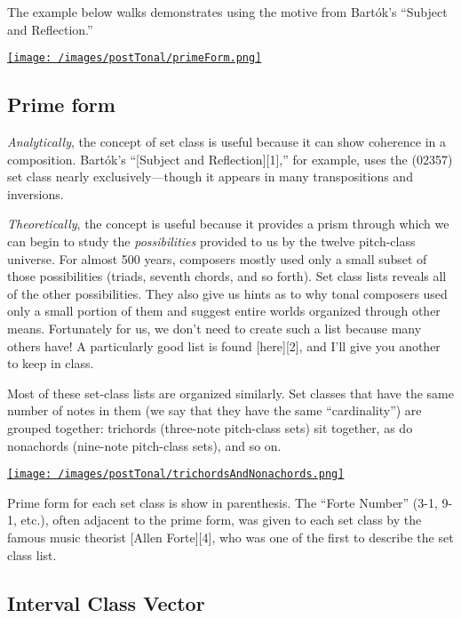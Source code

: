 \documentclass{book}
\begin{document}
The example below walks demonstrates using the motive from Bartók's ``Subject
and Reflection.''

\href{/images/postTonal/primeForm.png}{\texttt{[image: /images/postTonal/primeForm.png]}}

\hypertarget{prime-form-2}{%
\subsection{Prime form}\label{prime-form-2}}

\emph{Analytically}, the concept of set class is useful because it can show
coherence in a composition. Bartók's ``{[}Subject and Reflection{]}{[}1{]},''
for example, uses the (02357) set class nearly exclusively---though it appears
in many transpositions and inversions.

\emph{Theoretically}, the concept is useful because it provides a prism
through which we can begin to study the \emph{possibilities} provided to us by
the twelve pitch-class universe. For almost 500 years, composers mostly used
only a small subset of those possibilities (triads, seventh chords, and so
forth). Set class lists reveals all of the other possibilities. They also give
us hints as to why tonal composers used only a small portion of them and
suggest entire worlds organized through other means. Fortunately for us, we
don't need to create such a list because many others have! A particularly good
list is found {[}here{]}{[}2{]}, and I'll give you another to keep in class.

Most of these set-class lists are organized similarly. Set classes that have
the same number of notes in them (we say that they have the same
``cardinality'') are grouped together: trichords (three-note pitch-class sets)
sit together, as do nonachords (nine-note pitch-class sets), and so on.

\href{/images/postTonal/trichordsAndNonachords.png}{\texttt{[image: /images/postTonal/trichordsAndNonachords.png]}}

Prime form for each set class is show in parenthesis. The ``Forte Number''
(3-1, 9-1, etc.), often adjacent to the prime form, was given to each set
class by the famous music theorist {[}Allen Forte{]}{[}4{]}, who was one of
the first to describe the set class list.

\hypertarget{interval-class-vector}{%
\subsection{Interval Class Vector}\label{interval-class-vector}}
\end{document}
